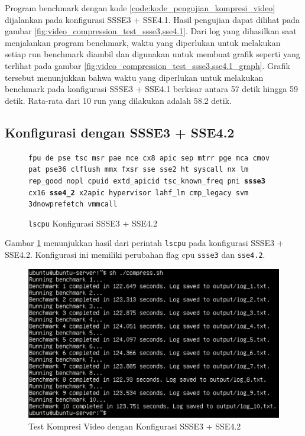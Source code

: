 Program benchmark dengan kode \ref{code:kode_pengujian_kompresi_video} dijalankan pada konfigurasi SSSE3 + SSE4.1. Hasil pengujian dapat dilihat pada gambar \ref{fig:video_compression_test_ssse3,sse4.1}. Dari log yang dihasilkan saat menjalankan program benchmark, waktu yang diperlukan untuk melakukan setiap run benchmark diambil dan digunakan untuk membuat grafik seperti yang terlihat pada gambar \ref{fig:video_compression_test_ssse3,sse4.1_graph}. Grafik tersebut menunjukkan bahwa waktu yang diperlukan untuk melakukan benchmark pada konfigurasi SSSE3 + SSE4.1 berkisar antara 57 detik hingga 59 detik. Rata-rata dari 10 run yang dilakukan adalah 58.2 detik.

\subsection{Konfigurasi dengan SSSE3 + SSE4.2}
\begin{figure}
    \texttt{fpu de pse tsc msr pae mce cx8 apic sep mtrr pge mca cmov pat pse36 clflush mmx fxsr sse sse2 ht syscall nx lm rep\_good nopl cpuid extd\_apicid tsc\_known\_freq pni \textbf{ssse3} cx16 \textbf{sse4\_2} x2apic hypervisor lahf\_lm cmp\_legacy svm 3dnowprefetch vmmcall}
    \caption{\texttt{lscpu} Konfigurasi SSSE3 + SSE4.2}
    \label{fig:lscpu_video_compression_test_ssse3,sse4.2}
\end{figure}

Gambar \ref{fig:lscpu_video_compression_test_ssse3,sse4.2} menunjukkan hasil dari perintah \texttt{lscpu} pada konfigurasi SSSE3 + SSE4.2. Konfigurasi ini memiliki perubahan flag cpu \texttt{ssse3} dan \texttt{sse4.2}.

\begin{figure}
    \centering
    \includegraphics[width=1\textwidth]
    {assets/pics/video-compression-test/ssse3,sse4.2.jpeg}
    \caption{Test Kompresi Video dengan Konfigurasi SSSE3 + SSE4.2}
    \label{fig:video_compression_test_ssse3,sse4.2}
\end{figure}

